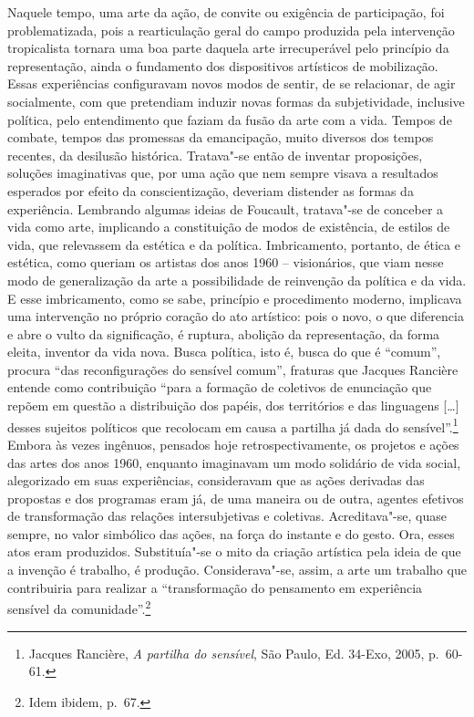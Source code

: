 Naquele tempo, uma arte da ação, de convite ou exigência de
participação, foi problematizada, pois a rearticulação geral do campo
produzida pela intervenção tropicalista tornara uma boa parte daquela
arte irrecuperável pelo princípio da representação, ainda o fundamento
dos dispositivos artísticos de mobilização. Essas experiências
configuravam novos modos de sentir, de se relacionar, de agir
socialmente, com que pretendiam induzir novas formas da subjetividade,
inclusive política, pelo entendimento que faziam da fusão da arte com a
vida. Tempos de combate, tempos das promessas da emancipação, muito
diversos dos tempos recentes, da desilusão histórica. Tratava"-se então
de inventar proposições, soluções imaginativas que, por uma ação que nem
sempre visava a resultados esperados por efeito da conscientização,
deveriam distender as formas da experiência. Lembrando algumas ideias de
Foucault, tratava"-se de conceber a vida como arte, implicando a
constituição de modos de existência, de estilos de vida, que relevassem
da estética e da política. Imbricamento, portanto, de ética e estética,
como queriam os artistas dos anos 1960 -- visionários, que viam nesse
modo de generalização da arte a possibilidade de reinvenção da política
e da vida. E esse imbricamento, como se sabe, princípio e procedimento
moderno, implicava uma intervenção no próprio coração do ato artístico:
pois o novo, o que diferencia e abre o vulto da significação, é ruptura,
abolição da representação, da forma eleita, inventor da vida nova. Busca
política, isto é, busca do que é ``comum'', procura ``das
reconfigurações do sensível comum'', fraturas que Jacques Rancière
entende como contribuição ``para a formação de coletivos de enunciação
que repõem em questão a distribuição dos papéis, dos territórios e das
linguagens {[}\ldots{}{]} desses sujeitos políticos que recolocam em causa a
partilha já dada do sensível''.\footnote{Jacques Rancière, \emph{A partilha do sensível}, São
Paulo, Ed. 34-Exo, 2005, p.~60-61.} Embora às vezes
ingênuos, pensados hoje retrospectivamente, os projetos e ações das
artes dos anos 1960, enquanto imaginavam um modo solidário de vida
social, alegorizado em suas experiências, consideravam que as ações
derivadas das propostas e dos programas eram já, de uma maneira ou de
outra, agentes efetivos de transformação das relações intersubjetivas e
coletivas. Acreditava"-se, quase sempre, no valor simbólico das ações, na
força do instante e do gesto. Ora, esses atos eram produzidos.
Substituía"-se o mito da criação artística pela ideia de que a invenção é
trabalho, é produção. Considerava"-se, assim, a arte um trabalho que
contribuiria para realizar a ``transformação do pensamento em
experiência sensível da comunidade''.\footnote{Idem ibidem, p.~67.}


